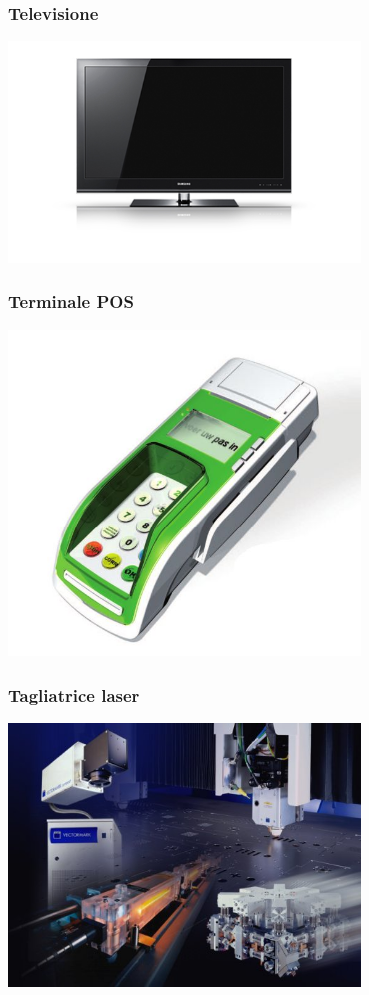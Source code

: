 \documentclass[xetex,table]{beamer}
\begin{document}
\begin{frame}
\frametitle{Televisione}
  \begin{center}
    \includegraphics[width=0.7\textwidth]{images/television.jpg}
  \end{center}
\end{frame}

\begin{frame}
\frametitle{Terminale POS}
  \begin{center}
    \includegraphics[width=0.7\textwidth]{images/point-of-sale.jpg}
  \end{center}
\end{frame}

\begin{frame}
\frametitle{Tagliatrice laser}
  \begin{center}
    \includegraphics[width=0.7\textwidth]{images/laser-cutting-machine.jpg}
  \end{center}
\end{frame}
\end{document}
